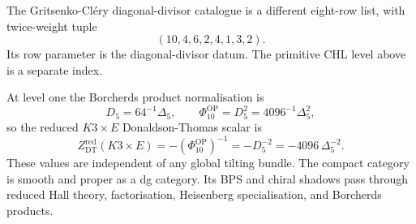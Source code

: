The Gritsenko-Cl\'ery diagonal-divisor catalogue is a different
eight-row list, with twice-weight tuple
\[
  (10,4,6,2,4,1,3,2).
\]
Its row parameter is the diagonal-divisor datum. The primitive CHL
level above is a separate index.

At level one the Borcherds product normalisation is
\[
  D_5=64^{-1}\Delta_5,
  \qquad
  \Phi_{10}^{\mathrm{OP}}=D_5^2=4096^{-1}\Delta_5^2,
\]
so the reduced \(K3\times E\) Donaldson-Thomas scalar is
\[
  Z^{\mathrm{red}}_{\mathrm{DT}}(K3\times E)
  =
  -(\Phi_{10}^{\mathrm{OP}})^{-1}
  =
  -D_5^{-2}
  =
  -4096\,\Delta_5^{-2}.
\]
These values are independent of any global tilting bundle.  The
compact category is smooth and proper as a dg category.  Its BPS and
chiral shadows pass through reduced Hall theory, factorisation,
Heisenberg specialisation, and Borcherds products.
